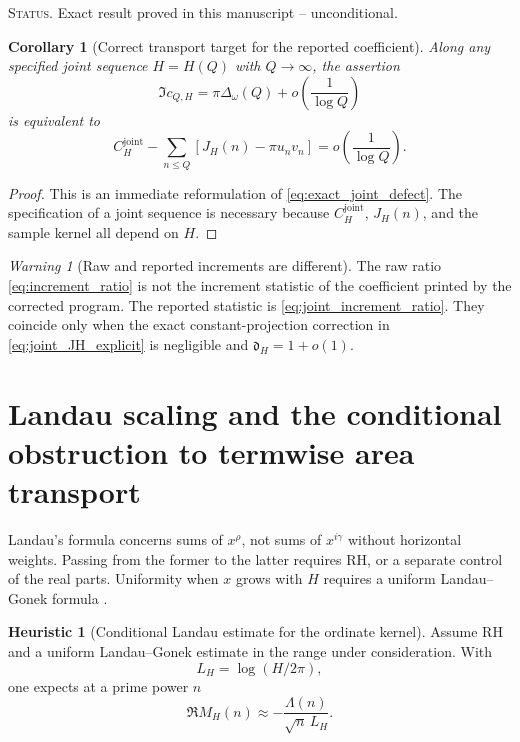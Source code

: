 \documentclass[11pt]{amsart}
\numberwithin{equation}{section}
\theoremstyle{plain}
\newtheorem{corollary}[theorem]{Corollary}
\theoremstyle{definition}
\newtheorem{heuristic}[theorem]{Heuristic}
\theoremstyle{remark}
\newtheorem{warning}[theorem]{Warning}
\newcommand{\RH}{\mathrm{RH}}
\newcommand{\1}{\mathbf{1}}
\newcommand{\statusnote}[1]{%
  \par\smallskip\noindent
  \begingroup\footnotesize\textsc{Status.} #1\endgroup
  \par\smallskip}
\begin{document}
\statusnote{Exact result proved in this manuscript -- unconditional.}
\begin{corollary}[Correct transport target for the reported coefficient]
\label{cor:joint_transport_target}
Along any specified joint sequence \(H=H(Q)\) with \(Q\to\infty\), the
assertion
\begin{equation}
\Im c_{Q,H}
=
\pi\Delta_\omega(Q)
+
o\!\left(\frac1{\log Q}\right)
\label{eq:joint_transport_relation}
\end{equation}
is equivalent to
\begin{equation}
\boxed{
C_H^{\mathrm{joint}}
-
\sum_{n\leq Q}
\left[J_H(n)-\pi u_nv_n\right]
=
o\!\left(\frac1{\log Q}\right).
}
\label{eq:joint_transport_equivalent_target}
\end{equation}
\end{corollary}

\begin{proof}
This is an immediate reformulation of
\eqref{eq:exact_joint_defect}.  The specification of a joint sequence is
necessary because \(C_H^{\mathrm{joint}}\), \(J_H(n)\), and the sample
kernel all depend on \(H\).
\end{proof}

\begin{warning}[Raw and reported increments are different]
\label{warn:raw_joint_increment_difference}
The raw ratio \eqref{eq:increment_ratio} is not the increment statistic of
the coefficient printed by the corrected program.  The reported statistic
is \eqref{eq:joint_increment_ratio}.  They coincide only when the exact
constant-projection correction in \eqref{eq:joint_JH_explicit} is
negligible and \(\mathfrak d_H=1+o(1)\).
\end{warning}

\section{Landau scaling and the conditional obstruction to termwise area transport}
\label{sec:landau_scaling}

Landau's formula concerns sums of \(x^\rho\), not sums of \(x^{i\gamma}\)
without horizontal weights.  Passing from the former to the latter requires
\(\RH\), or a separate control of the real parts.  Uniformity when \(x\)
grows with \(H\) requires a uniform Landau--Gonek formula
\cite{Gonek1985,FordZaharescu2005}.

\begin{heuristic}[Conditional Landau estimate for the ordinate kernel]
\label{heur:landau_kernel}
Assume \(\RH\) and a uniform Landau--Gonek estimate in the range under
consideration.  With
\begin{equation}
L_H=\log(H/2\pi),
\label{eq:LH_definition}
\end{equation}
one expects at a prime power \(n\)
\begin{equation}
\Re M_H(n)
\approx
-\frac{\Lambda(n)}{\sqrt n\,L_H}.
\label{eq:MH_landau_heuristic}
\end{equation}
\end{heuristic}
\end{document}
